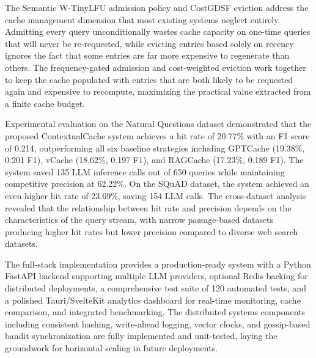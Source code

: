 \documentclass[12pt,a4paper]{report}
\begin{document}
The Semantic W-TinyLFU admission policy and CostGDSF eviction address the cache management dimension that most existing systems neglect entirely. Admitting every query unconditionally wastes cache capacity on one-time queries that will never be re-requested, while evicting entries based solely on recency ignores the fact that some entries are far more expensive to regenerate than others. The frequency-gated admission and cost-weighted eviction work together to keep the cache populated with entries that are both likely to be requested again and expensive to recompute, maximizing the practical value extracted from a finite cache budget.

Experimental evaluation on the Natural Questions dataset demonstrated that the proposed ContextualCache system achieves a hit rate of 20.77\% with an F1 score of 0.214, outperforming all six baseline strategies including GPTCache (19.38\%, 0.201 F1), vCache (18.62\%, 0.197 F1), and RAGCache (17.23\%, 0.189 F1). The system saved 135 LLM inference calls out of 650 queries while maintaining competitive precision at 62.22\%. On the SQuAD dataset, the system achieved an even higher hit rate of 23.69\%, saving 154 LLM calls. The cross-dataset analysis revealed that the relationship between hit rate and precision depends on the characteristics of the query stream, with narrow passage-based datasets producing higher hit rates but lower precision compared to diverse web search datasets.

The full-stack implementation provides a production-ready system with a Python FastAPI backend supporting multiple LLM providers, optional Redis backing for distributed deployments, a comprehensive test suite of 120 automated tests, and a polished Tauri/SvelteKit analytics dashboard for real-time monitoring, cache comparison, and integrated benchmarking. The distributed systems components including consistent hashing, write-ahead logging, vector clocks, and gossip-based bandit synchronization are fully implemented and unit-tested, laying the groundwork for horizontal scaling in future deployments.
\end{document}

